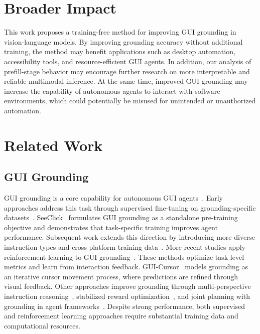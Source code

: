 \documentclass{article}
\begin{document}





\newpage
\appendix

\section{Broader Impact}
\label{app:broader_impact}
This work proposes a training-free method for improving GUI grounding in vision-language models. By improving grounding accuracy without additional training, the method may benefit applications such as desktop automation, accessibility tools, and resource-efficient GUI agents. In addition, our analysis of prefill-stage behavior may encourage further research on more interpretable and reliable multimodal inference.
At the same time, improved GUI grounding may increase the capability of autonomous agents to interact with software environments, which could potentially be misused for unintended or unauthorized automation. 


\section{Related Work}
\label{sec:relatedwork}

\subsection{GUI Grounding}

GUI grounding is a core capability for autonomous GUI agents~\citep{survey_nguyen2025gui, survey_zhang2024large, survey_wang2024gui, survey_tang2025survey}.
Early approaches address this task through supervised fine-tuning on grounding-specific datasets~\citep{showui, uground, cogagent}.
SeeClick~\citep{seeclick} formulates GUI grounding as a standalone pre-training objective and demonstrates that task-specific training improves agent performance.
Subsequent work extends this direction by introducing more diverse instruction types and cross-platform training data~\citep{osatlas, uground, ariaui, evocua, opencua}.
More recent studies apply reinforcement learning to GUI grounding~\citep{guir1, yuan2025enhancing, uivenus, guieyes}. These methods optimize task-level metrics and learn from interaction feedback.
GUI-Cursor~\citep{guicursor} models grounding as an iterative cursor movement process, where predictions are refined through visual feedback.
Other approaches improve grounding through multi-perspective instruction reasoning~\citep{uiins}, stabilized reward optimization~\citep{guirlvg}, and joint planning with grounding in agent frameworks~\citep{gta1}.
Despite strong performance, both supervised and reinforcement learning approaches require substantial training data and computational resources.
\end{document}
